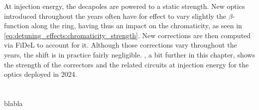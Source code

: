 At injection energy, the decapoles are powered to a static strength. New optics introduced
throughout the years often have for effect to vary slightly the $\beta$-function along the ring,
having thus an impact on the chromaticity, as seen in
\cref{eq:detuning_effects:chromaticity_strength}. New corrections are then computed via FiDeL to
account for it.
Although those corrections vary throughout the years, the shift is in practice fairly negligible.
, a bit further in this chapter, shows the strength of
the correctors and the related circuits at injection energy for the optics deployed in 2024.

















\section{}

blabla